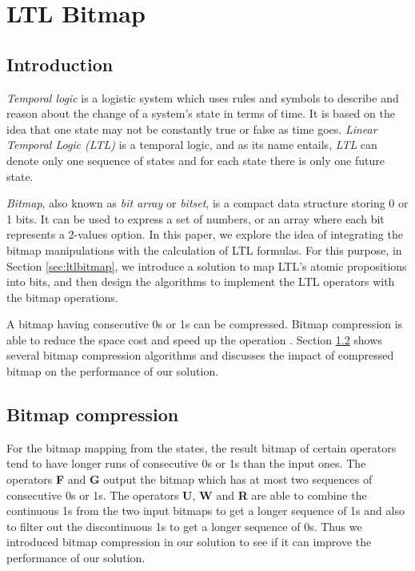 
\chapter{LTL Bitmap}

\section{Introduction}\label{sec:intro} %

\emph{Temporal logic} \cite{huth2004} is a logistic system which uses rules and symbols to describe and reason about the change of a system's state in terms of time. It is based on the idea that one state may not be constantly true or false as time goes. \emph{Linear Temporal Logic (LTL)} \cite{pnueli97} is a temporal logic, and as its name entails, \emph{LTL} can denote only one sequence of states and for each state there is only one future state.

\emph{Bitmap}, also known as \emph{bit array} or \emph{bitset}, is a compact data structure storing 0 or 1 bits. It can be used to express a set of numbers, or an array where each bit represents a 2-values option. In this paper, we explore the idea of integrating the bitmap manipulations with the calculation of LTL formulas. For this purpose, in Section \ref{sec:ltlbitmap}, we introduce a solution to map LTL's atomic propositions into bits, and then design the algorithms to implement the LTL operators with the bitmap operations.

A bitmap having consecutive 0s or 1s can be compressed. Bitmap compression is able to reduce the space cost and speed up the operation \cite{lemire2014}. Section \ref{sec:compression} shows several bitmap compression algorithms and discusses the impact of compressed bitmap on the performance of our solution. 


\section{Bitmap compression}\label{sec:compression} %

For the bitmap mapping from the states, the result bitmap of certain operators tend to have longer runs of consecutive 0s or 1s than the input ones. The operators \textbf{F} and \textbf{G} output the bitmap which has at most two sequences of consecutive 0s or 1s. The operators \textbf{U}, \textbf{W} and \textbf{R} are able to combine the continuous 1s from the two input bitmaps to get a longer sequence of 1s and also to filter out the discontinuous 1s to get a longer sequence of 0s. Thus we introduced bitmap compression in our solution to see if it can improve the performance of our solution.

